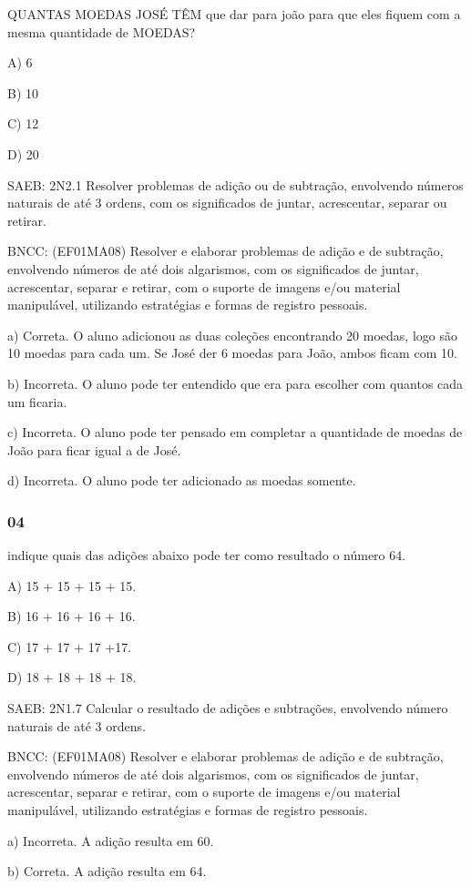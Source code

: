 QUANTAS MOEDAS JOSÉ TÊM que dar para joão para que eles fiquem com a
mesma quantidade de MOEDAS?

A) 6

B) 10

C) 12

D) 20

SAEB: 2N2.1 Resolver problemas de adição ou de subtração, envolvendo
números naturais de até 3 ordens, com os significados de juntar,
acrescentar, separar ou retirar.

BNCC: (EF01MA08) Resolver e elaborar problemas de adição e de subtração,
envolvendo números de até dois algarismos, com os significados de
juntar, acrescentar, separar e retirar, com o suporte de imagens e/ou
material manipulável, utilizando estratégias e formas de registro
pessoais.

a) Correta. O aluno adicionou as duas coleções encontrando 20 moedas,
logo são 10 moedas para cada um. Se José der 6 moedas para João, ambos
ficam com 10.

b) Incorreta. O aluno pode ter entendido que era para escolher com
quantos cada um ficaria.

c) Incorreta. O aluno pode ter pensado em completar a quantidade de
moedas de João para ficar igual a de José.

d) Incorreta. O aluno pode ter adicionado as moedas somente.

\subsubsection{04}\label{section-105}

indique quais das adições abaixo pode ter como resultado o número 64.

A) 15 + 15 + 15 + 15.

B) 16 + 16 + 16 + 16.

C) 17 + 17 + 17 +17.

D) 18 + 18 + 18 + 18.

SAEB: 2N1.7 Calcular o resultado de adições e subtrações, envolvendo
número naturais de até 3 ordens.

BNCC: (EF01MA08) Resolver e elaborar problemas de adição e de subtração,
envolvendo números de até dois algarismos, com os significados de
juntar, acrescentar, separar e retirar, com o suporte de imagens e/ou
material manipulável, utilizando estratégias e formas de registro
pessoais.

a) Incorreta. A adição resulta em 60.

b) Correta. A adição resulta em 64.

